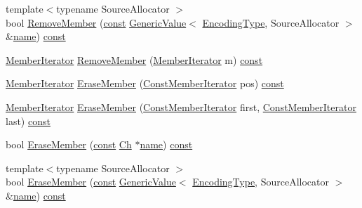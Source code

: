 \begin{DoxyCompactItemize}
\item 
{\footnotesize template$<$typename Source\+Allocator $>$ }\\bool \hyperlink{classGenericObject_a8e29dc07b992e71e35dd93a57f95842c}{Remove\+Member} (\hyperlink{classGenericObject_af70c9646b5e422306c33e98b3d8783a7}{const} \hyperlink{classGenericValue}{Generic\+Value}$<$ \hyperlink{classGenericObject_a96ebfdde095e2ce42535d15ae5dc58ef}{Encoding\+Type}, Source\+Allocator $>$ \&\hyperlink{imgui__impl__opengl3__loader_8h_a5c4947d4516dd7cfa3505ce3a648a4ef}{name}) \hyperlink{classGenericObject_af70c9646b5e422306c33e98b3d8783a7}{const}
\item 
\hyperlink{classGenericObject_a1f531d70f8d57ed30199ac445b5935e6}{Member\+Iterator} \hyperlink{classGenericObject_a006f76a33dada85c9d13e069cc43623d}{Remove\+Member} (\hyperlink{classGenericObject_a1f531d70f8d57ed30199ac445b5935e6}{Member\+Iterator} m) \hyperlink{classGenericObject_af70c9646b5e422306c33e98b3d8783a7}{const}
\item 
\hyperlink{classGenericObject_a1f531d70f8d57ed30199ac445b5935e6}{Member\+Iterator} \hyperlink{classGenericObject_a29ad0490a4a088d57df7a9884f979a82}{Erase\+Member} (\hyperlink{classGenericObject_af16706c0ad32b957c56e7d0541628cd5}{Const\+Member\+Iterator} pos) \hyperlink{classGenericObject_af70c9646b5e422306c33e98b3d8783a7}{const}
\item 
\hyperlink{classGenericObject_a1f531d70f8d57ed30199ac445b5935e6}{Member\+Iterator} \hyperlink{classGenericObject_a67f85d2da462287dead8e35f2ac974b5}{Erase\+Member} (\hyperlink{classGenericObject_af16706c0ad32b957c56e7d0541628cd5}{Const\+Member\+Iterator} first, \hyperlink{classGenericObject_af16706c0ad32b957c56e7d0541628cd5}{Const\+Member\+Iterator} last) \hyperlink{classGenericObject_af70c9646b5e422306c33e98b3d8783a7}{const}
\item 
bool \hyperlink{classGenericObject_af0d31a8547051624449494a339b20107}{Erase\+Member} (\hyperlink{classGenericObject_af70c9646b5e422306c33e98b3d8783a7}{const} \hyperlink{classGenericObject_ac6747e5baa13e15bcea1658b5624647a}{Ch} $\ast$\hyperlink{imgui__impl__opengl3__loader_8h_a5c4947d4516dd7cfa3505ce3a648a4ef}{name}) \hyperlink{classGenericObject_af70c9646b5e422306c33e98b3d8783a7}{const}
\item 
{\footnotesize template$<$typename Source\+Allocator $>$ }\\bool \hyperlink{classGenericObject_a4cd6f90444f20cc9d5577747d3968da4}{Erase\+Member} (\hyperlink{classGenericObject_af70c9646b5e422306c33e98b3d8783a7}{const} \hyperlink{classGenericValue}{Generic\+Value}$<$ \hyperlink{classGenericObject_a96ebfdde095e2ce42535d15ae5dc58ef}{Encoding\+Type}, Source\+Allocator $>$ \&\hyperlink{imgui__impl__opengl3__loader_8h_a5c4947d4516dd7cfa3505ce3a648a4ef}{name}) \hyperlink{classGenericObject_af70c9646b5e422306c33e98b3d8783a7}{const}
\end{DoxyCompactItemize}
